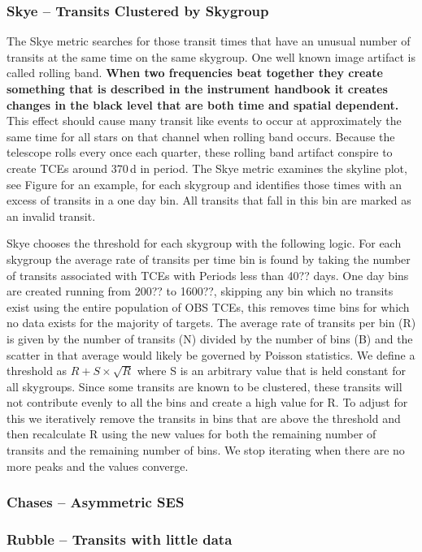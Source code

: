  
\subsubsection{Skye -- Transits Clustered by Skygroup}

The Skye metric searches for those transit times that have an unusual number of transits at the same time on the same skygroup.   One well known image artifact is called rolling band. \textbf{When two frequencies beat together they create something that is described in the instrument handbook it creates changes in the black level that are both time and spatial dependent.} This effect should cause many transit like events to occur at approximately the same time for all stars on that channel when rolling band occurs. Because the telescope rolls every once each quarter, these rolling band artifact conspire to create TCEs around 370\,d in period.  The Skye metric examines the skyline plot, see Figure\label{f:skyline} for an example, for each skygroup and identifies those times with an excess of transits in a one day bin.  All transits that fall in this bin are marked as an invalid transit.

Skye chooses the threshold for each skygroup with the following logic.  For each skygroup the average rate of transits per time bin is found by taking the number of transits associated with TCEs with Periods less than 40?? days. One day bins are created running from 200?? to 1600??, skipping any bin which no transits exist using the entire population of OBS TCEs, this removes time bins for which no data exists for the majority of targets.  The average rate of transits per bin (R) is given by the number of transits (N) divided by the number of bins (B) and the scatter in that average would likely be governed by Poisson statistics.  We define a threshold as $R + S \times \sqrt{R}$ where S is an arbitrary value that is held constant for all skygroups.  Since some transits are known to be clustered, these transits will not contribute evenly to all the bins and create a high value for R. To adjust for this we iteratively remove the transits in bins that are above the threshold and then recalculate R using the new values for both the remaining number of transits and the remaining number of bins. We stop iterating when there are no more peaks and the values converge.

\subsubsection{Chases -- Asymmetric SES}

\subsubsection{Rubble -- Transits with little data}

